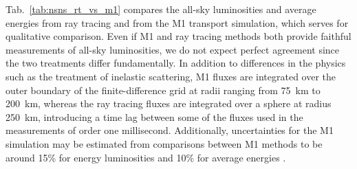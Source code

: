 \documentclass[aps,floatfix,prd,superscriptaddress,twocolumn]{revtex4-1}
\begin{document}
Tab.~\ref{tab:nsns_rt_vs_m1} compares the all-sky
luminosities and average energies from ray tracing and from
the M1 transport simulation,
which serves for qualitative comparison.
Even if M1 and ray tracing methods both provide faithful measurements
of all-sky luminosities, we do not expect perfect agreement since the two
treatments differ fundamentally. In addition to differences in the physics
such as the treatment of inelastic scattering,
M1 fluxes are integrated over the outer boundary of the finite-difference grid
at radii ranging from 75~km to 200~km,
whereas the ray tracing fluxes are integrated over a sphere at radius 250~km,
introducing a time lag between some of the fluxes used in the measurements
of order one millisecond.
Additionally, uncertainties for the M1 simulation may be estimated from
comparisons between M1 methods to be around
15\% for energy luminosities and
10\% for average energies \cite[Sec.~A.6]{fouc2016-m1_evolve_n}.
\end{document}
